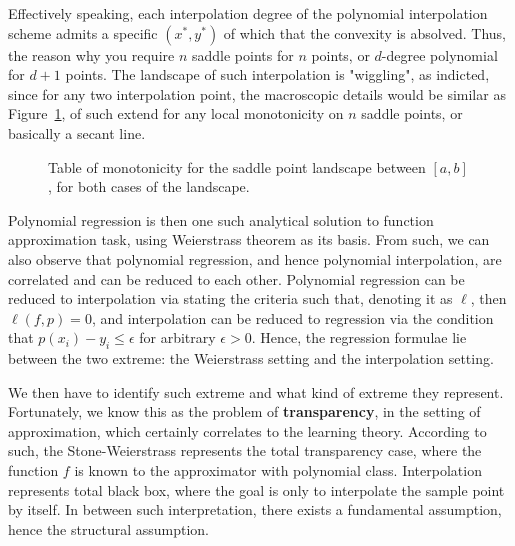 \documentclass[
  journal=largetwo,
  year=2025,
  volume=37,
]{cup-journal}
\begin{document}
Effectively speaking, each interpolation degree of the polynomial interpolation scheme admits a specific $(x^{*},y^{*})$ of which that the convexity is absolved. Thus, the reason why you require $n$ saddle points for $n$ points, or $d$-degree polynomial for $d+1$ points. The landscape of such interpolation is "wiggling", as indicted, since for any two interpolation point, the macroscopic details would be similar as Figure~\ref{fig:monotonicity_test}, of such extend for any local monotonicity on $n$ saddle points, or basically a secant line. 

\begin{figure}[htb]
    \centering
\caption{\small Table of monotonicity for the saddle point landscape between $[a,b]$, for both cases of the landscape.}
\label{fig:monotonicity_test}
\end{figure}

Polynomial regression is then one such analytical solution to function approximation task, using Weierstrass theorem as its basis. From such, we can also observe that polynomial regression, and hence polynomial interpolation, are correlated and can be reduced to each other. Polynomial regression can be reduced to interpolation via stating the criteria such that, denoting it as $\ell$, then $\ell(f,p)=0$, and interpolation can be reduced to regression via the condition that $p(x_{i})-y_{i}\leq \epsilon$ for arbitrary $\epsilon>0$. Hence, the regression formulae lie between the two extreme: the Weierstrass setting and the interpolation setting. 

We then have to identify such extreme and what kind of extreme they represent. Fortunately, we know this as the problem of \textbf{transparency}, in the setting of approximation, which certainly correlates to the learning theory. According to such, the Stone-Weierstrass represents the total transparency case, where the function $f$ is known to the approximator with polynomial class. Interpolation represents total black box, where the goal is only to interpolate the sample point by itself. In between such interpretation, there exists a fundamental assumption, hence the structural assumption. 
\end{document}
